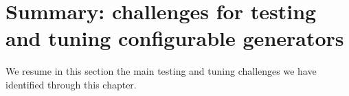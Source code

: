  



\section{Summary: challenges for testing and tuning configurable generators}
\label{bg:Summary: Testing and optimization challenges}
We resume in this section the main testing and tuning challenges we have identified through this chapter.
